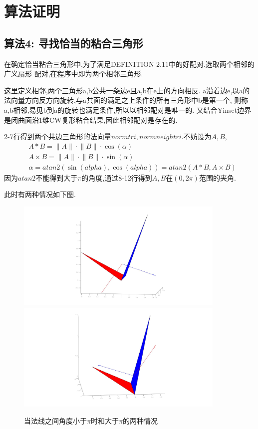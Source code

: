 \documentclass[a4paper]{book}
\numberwithin{equation}{chapter}
\theoremstyle{definition}
\begin{document}
\section{算法证明}
\subsection{算法4: 寻找恰当的粘合三角形}
在确定恰当粘合三角形中,为了满足DEFINITION 2.11中的好配对.选取两个相邻的广义扇形
配对,在程序中即为两个相邻三角形.

这里定义相邻,两个三角形a,b公共一条边e且a,b在e上的方向相反.
a沿着边e,以a的法向量方向反方向旋转,与a共面的满足之上条件的所有三角形中b是第一个,
则称a,b相邻,易见b到a的旋转也满足条件,所以以相邻配对是唯一的.
又结合Yinset边界是闭曲面沿1维CW复形粘合结果,因此相邻配对是存在的.

2-7行得到两个共边三角形的法向量$normtri,normneightri$.不妨设为$A,B$,
\begin{align}
	&A * B = \lVert A \rVert \cdot \lVert B \rVert \cdot \cos(\alpha) \\
	&A \times B = \lVert A \rVert \cdot \lVert B \rVert \cdot \sin(\alpha) \\
	&\alpha = atan2(\sin(alpha), \cos(alpha)) = atan2(A * B, A \times B) 
\end{align}
因为$atan2$不能得到大于$\pi$的角度,通过8-12行得到$A,B$在$(0,2\pi)$范围的夹角.

此时有两种情况如下图.
\begin{figure}
	\caption{当法线之间角度小于$\pi$时和大于$\pi$的两种情况}
	\includegraphics[width=10cm]{fig/nearsituation1.jpg}
	\includegraphics[width=10cm]{fig/nearsituation2.jpg}
\end{figure}
\end{document}
